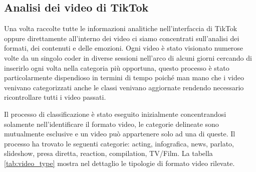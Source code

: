 \subsection{Analisi dei video di TikTok}

Una volta raccolte tutte le informazioni analitiche nell'interfaccia di TikTok oppure direttamente all'interno dei video ci siamo 
concentrati sull'analisi dei formati, dei contenuti e delle emozioni.
Ogni video è stato visionato numerose volte da un singolo coder in diverse sessioni nell'arco di alcuni giorni cercando di inserirlo 
ogni volta nella categoria più opportuna, questo processo è stato particolarmente dispendioso in termini di tempo poiché man mano che 
i video venivano categorizzati anche le classi venivano aggiornate rendendo necessario ricontrollare tutti i video passati.

Il processo di classificazione è stato eseguito inizialmente concentrandosi solamente nell'identificare il formato video, 
le categorie delineate sono mutualmente esclusive e un video può appartenere solo ad una di queste. Il processo ha trovato 
le seguenti categorie: acting, infografica, news, parlato, slideshow, presa diretta, reaction, compilation, TV/Film. 
La tabella \ref{tab:video_type} mostra nel dettaglio le tipologie di formato video rilevate.

